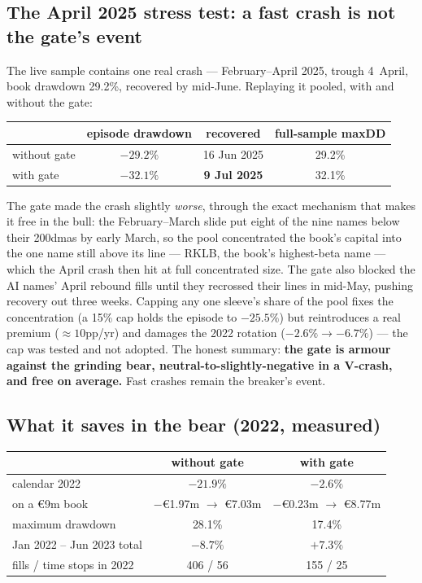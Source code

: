 \documentclass[11pt,a4paper]{article}
\newcommand{\good}[1]{{\color{bcteal}\textbf{#1}}}
\newcommand{\bad}[1]{{\color{bcred}\textbf{#1}}}
\begin{document}
\subsection{The April 2025 stress test: a fast crash is not the gate's event}

The live sample contains one real crash --- February--April 2025, trough 4~April,
book drawdown 29.2\%, recovered by mid-June. Replaying it pooled, with and
without the gate:

\begin{center}
\begin{tabular}{lccc}
\toprule
 & episode drawdown & recovered & full-sample maxDD \\
\midrule
without gate & $-29.2\%$ & 16 Jun 2025 & 29.2\% \\
with gate    & \bad{$-32.1\%$} & \bad{9 Jul 2025} & 32.1\% \\
\bottomrule
\end{tabular}
\end{center}

The gate made the crash slightly \emph{worse}, through the exact mechanism that
makes it free in the bull: the February--March slide put eight of the nine names
below their 200dmas by early March, so the pool concentrated the book's capital
into the one name still above its line --- RKLB, the book's highest-beta name ---
which the April crash then hit at full concentrated size. The gate also blocked
the AI names' April rebound fills until they recrossed their lines in mid-May,
pushing recovery out three weeks. Capping any one sleeve's share of the pool
fixes the concentration (a 15\% cap holds the episode to $-25.5\%$) but
reintroduces a real premium ($\approx 10$pp/yr) and damages the 2022 rotation
($-2.6\% \rightarrow -6.7\%$) --- the cap was tested and not adopted. The honest
summary: \textbf{the gate is armour against the grinding bear, neutral-to-slightly-negative
in a V-crash, and free on average.} Fast crashes remain the breaker's event.

\subsection{What it saves in the bear (2022, measured)}

\begin{center}
\begin{tabular}{lcc}
\toprule
 & without gate & with gate \\
\midrule
calendar 2022                & \bad{$-21.9\%$} & \good{$-2.6\%$} \\
on a €9m book                & $-$€1.97m $\rightarrow$ €7.03m & $-$€0.23m $\rightarrow$ €8.77m \\
maximum drawdown             & 28.1\% & 17.4\% \\
Jan 2022 -- Jun 2023 total   & $-8.7\%$ & \good{$+7.3\%$} \\
fills / time stops in 2022   & 406 / 56 & 155 / 25 \\
\bottomrule
\end{tabular}
\end{center}
\end{document}
